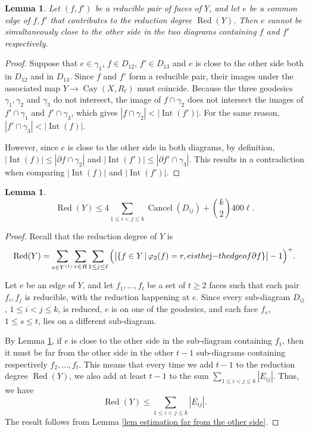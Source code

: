 \documentclass[a4paper]{article}
\DeclareMathOperator{\Red}{Red}
\DeclareMathOperator{\Int}{Int}
\DeclareMathOperator{\Cay}{Cay}
\DeclareMathOperator{\Cancel}{Cancel}
\newtheorem{lem}[thm]{Lemma}
\theoremstyle{remark}
\begin{document}
\begin{lem}\label{lem reducible can not be close}
    Let $(f, f')$ be a reducible pair of faces of $Y$, and let $e$ be a common edge of $f, f'$ that contributes to the reduction degree $\Red(Y)$. Then $e$ cannot be simultaneously close to the other side in the two diagrams containing $f$ and $f'$ respectively. 
\end{lem}
\begin{proof}
    Suppose that $e\in \gamma_1$, $f\in D_{12}$, $f'\in D_{13}$ and $e$ is close to the other side both in $D_{12}$ and in $D_{13}$. Since $f$ and $f'$ form a reducible pair, their images under the associated map $Y\to\Cay(X,R_\ell)$ must coincide. Because the three geodesics $\gamma_1, \gamma_2$ and $\gamma_3$ do not intersect, the image of $f\cap \gamma_2$ does not intersect the images of $f'\cap \gamma_1$ and $f'\cap\gamma_3$, which gives $|f\cap \gamma_2|<|\Int (f')|$. For the same reason, $|f'\cap \gamma_3|<|\Int (f)|$.

    However, since $e$ is close to the other side in both diagrams, by definition, $|\Int(f)| \leq |\partial f \cap \gamma_2|$ and $|\Int(f')| \leq |\partial f' \cap \gamma_3|$. This results in a contradiction when comparing $|\Int (f)|$ and $|\Int (f')|$.
\end{proof}

\begin{lem}\label{inequality reduction degree}
    \[\Red(Y)\leq 4\sum_{1\leq i<j\leq k}\Cancel(D_{ij})+\binom{k}{2}400\ell.\]
\end{lem}
\begin{proof}
    Recall that the reduction degree of $Y$ is
    \[\Red(Y) = \sum_{e\in Y^{(1)}}\sum_{r\in R}\sum_{1\leq j\leq \ell}\Big(\big|\{f\in Y \,|\, \varphi_2(f) = r, e \textup{ is the $j$-th edge of } \partial f\}\big| - 1 \Big)^+.\]

    Let $e$ be an edge of $Y$, and let $f_1,\dots,f_t$ be a set of $t\geq 2$ faces such that each pair $f_i,f_j$ is reducible, with the reduction happening at $e$. Since every sub-diagram $D_{ij}$, $1\leq i<j\leq k$, is reduced, $e$ is on one of the geodesics, and each face $f_s$, $1\leq s\leq t$, lies on a different sub-diagram.
    
    By Lemma \ref{lem reducible can not be close}, if $e$ is close to the other side in the sub-diagram containing $f_1$, then it must be far from the other side in the other $t-1$ sub-diagrams containing respectively $f_2,\dots,f_t$. This means that every time we add $t-1$ to the reduction degree $\Red(Y)$, we also add at least $t-1$ to the sum $\displaystyle{\sum_{1\leq i<j \leq k}|E_{ij}|}$. Thus, we have
    \[\Red(Y)\leq \sum_{1\leq i<j \leq k}|E_{ij}|.\]
    The result follows from Lemma \ref{lem estimation far from the other side}.
\end{proof}\quad\\
\end{document}
